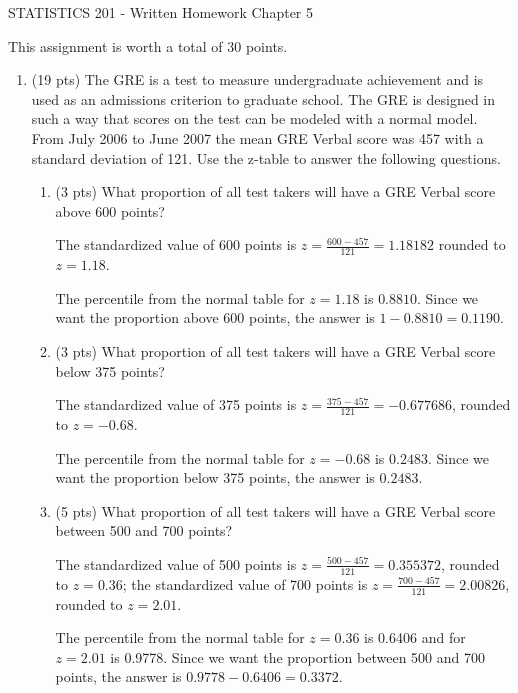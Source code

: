 \documentclass{article}
\begin{document}
\begin{center}
{\large STATISTICS 201 - Written Homework Chapter 5}\\[6mm]
\end{center}

\noindent
This assignment is worth a total of 30 points.

\begin{enumerate}

\item (19 pts) The GRE is a test to measure undergraduate achievement and is used as an admissions criterion to graduate school. The GRE is designed in such a way that scores on the test can be modeled with a normal model. From July 2006 to June 2007 the mean GRE Verbal score was 457 with a standard deviation of 121. Use the z-table to answer the following questions. 

\begin{enumerate}
\item (3 pts) What proportion of all test takers will have a GRE Verbal score above 600 points?

The standardized value of 600 points is $z = \frac{600-457}{121} = 1.18182$ rounded to $z = 1.18$. 

The percentile from the normal table for $z = 1.18$ is $0.8810$. Since we want the proportion above 600 points, the answer is $1-0.8810 = 0.1190$.

\item (3 pts) What proportion of all test takers will have a GRE Verbal score below 375 points?

The standardized value of 375 points is $z = \frac{375-457}{121} = -0.677686$, rounded to $z = -0.68$. 

The percentile from the normal table for $z = -0.68$ is $0.2483$. Since we want the proportion below 375 points, the answer is $0.2483$. 

\item (5 pts) What proportion of all test takers will have a GRE Verbal score between 500 and 700 points?

The standardized value of 500 points is $z = \frac{500-457}{121} = 0.355372$, rounded to $z = 0.36$; the standardized value of 700 points is $z = \frac{700-457}{121} = 2.00826$, rounded to $z = 2.01$. 

The percentile from the normal table for $z = 0.36$ is 0.6406 and for $z = 2.01$ is 0.9778. Since we want the proportion between 500 and 700 points, the answer is $0.9778 - 0.6406 = 0.3372$.


\end{enumerate}
\end{enumerate}
\end{document}
